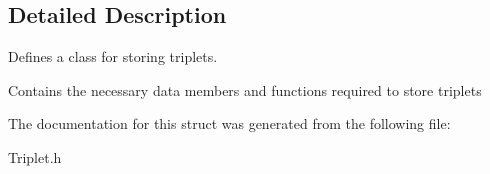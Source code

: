 \subsection{Detailed Description}
Defines a class for storing triplets. 

Contains the necessary data members and functions required to store triplets 

The documentation for this struct was generated from the following file\+:\begin{DoxyCompactItemize}
\item 
Triplet.\+h\end{DoxyCompactItemize}
